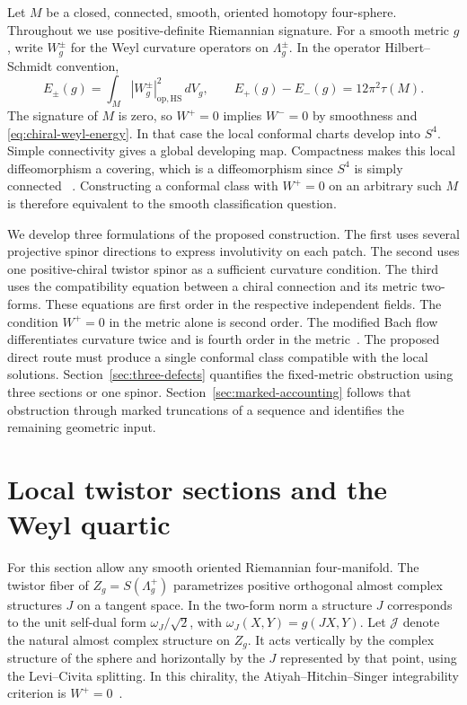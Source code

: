 \documentclass[11pt]{article}
\numberwithin{equation}{section}
\begin{document}
Let \(M\) be a closed, connected, smooth, oriented homotopy four-sphere.
Throughout we use positive-definite Riemannian signature. For a smooth
metric \(g\), write \(W_g^\pm\) for the Weyl curvature operators on
\(\Lambda_g^\pm\). In the operator Hilbert--Schmidt convention,
\begin{equation}\label{eq:chiral-weyl-energy}
 E_\pm(g)=\int_M |W_g^\pm|_{\mathrm{op,HS}}^2\,dV_g,\qquad
 E_+(g)-E_-(g)=12\pi^2\tau(M).
\end{equation}
The signature of \(M\) is zero, so \(W^+=0\) implies \(W^-=0\) by
smoothness and \eqref{eq:chiral-weyl-energy}. In that case the local
conformal charts develop into \(S^4\). Simple connectivity gives a
global developing map. Compactness makes this local diffeomorphism
a covering, which is a diffeomorphism since \(S^4\) is simply
connected~\cite[\S4, eq.~(16)]{Hirzebruch1971Signature}
\cite[pp.~47--50]{SchoenYau1988Conformal}. Constructing a conformal
class with \(W^+=0\) on an arbitrary such \(M\) is therefore equivalent
to the smooth classification question.

We develop three formulations of the proposed construction. The first
uses several projective spinor directions to express involutivity on
each patch. The second uses one positive-chiral twistor spinor as a
sufficient curvature condition. The third uses the compatibility
equation between a chiral connection and its metric two-forms. These
equations are first order in the respective independent fields. The
condition \(W^+=0\) in the metric alone is second order. The modified
Bach flow differentiates curvature twice and is fourth order in the
metric~\cite[eqs.~(1.1)--(1.2)]{BahuaudGuentherIsenbergMazzeo2025Bach}.
The proposed direct route must produce a single conformal class
compatible with the local solutions. Section~\ref{sec:three-defects}
quantifies the fixed-metric obstruction using three sections or one
spinor. Section~\ref{sec:marked-accounting} follows that obstruction
through marked truncations of a sequence and identifies the remaining
geometric input.

\section{Local twistor sections and the Weyl quartic}
\label{sec:local-sections}

For this section allow any smooth oriented Riemannian four-manifold.
The twistor fiber of \(Z_g=S(\Lambda_g^+)\) parametrizes positive
orthogonal almost complex structures \(J\) on a tangent space. In
the two-form norm a structure \(J\) corresponds to the unit
self-dual form \(\omega_J/\sqrt{2}\), with
\(\omega_J(X,Y)=g(JX,Y)\). Let \(\mathcal J\) denote the natural
almost complex structure on \(Z_g\). It acts vertically by the
complex structure of the sphere and horizontally by the \(J\)
represented by that point, using the Levi--Civita splitting. In this
chirality, the Atiyah--Hitchin--Singer integrability criterion is
\(W^+=0\)~\cite[Theorem~4.1, pp.~435--436]{AHS1978}.
\end{document}
